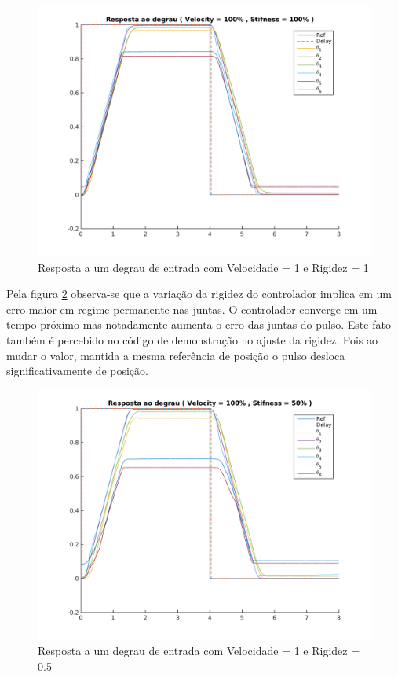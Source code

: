 \begin{figure}[H]
    \centering
    \includegraphics[width=\linewidth]{tex/figs/jointIdentification_exp1v100v100.png}
    \caption{Resposta a um degrau de entrada com Velocidade = 1 e Rigidez = 1}
    \label{fig:jointIdentification_exp1v100v100}
\end{figure}

Pela figura \ref{fig:jointIdentification_exp2v100v50} observa-se que a variação da rigidez do controlador implica em um erro maior em regime permanente nas juntas. O controlador converge em um tempo próximo mas notadamente aumenta o erro das juntas do pulso. Este fato também é percebido no código de demonstração no ajuste da rigidez. Pois ao mudar o valor, mantida a mesma referência de posição o pulso desloca significativamente de posição.

\begin{figure}[H]
    \centering
    \includegraphics[width=\linewidth]{tex/figs/jointIdentification_exp2v100v50.png}
    \caption{Resposta a um degrau de entrada com Velocidade = 1 e Rigidez = 0.5}
    \label{fig:jointIdentification_exp2v100v50}
\end{figure}

